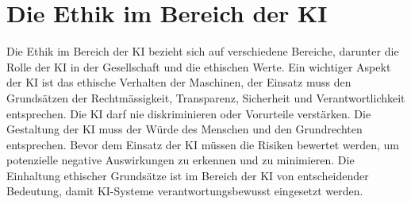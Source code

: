 \chapter{Die Ethik im Bereich der KI}
\label{chap:Die Ethik }

Die Ethik im Bereich der KI bezieht sich auf verschiedene Bereiche, darunter die Rolle der KI in der Gesellschaft und die ethischen Werte. Ein wichtiger Aspekt der KI ist das ethische Verhalten der Maschinen, der Einsatz muss den Grundsätzen der Rechtmässigkeit, Transparenz, Sicherheit und Verantwortlichkeit entsprechen. Die KI darf nie diskriminieren oder Vorurteile verstärken. Die Gestaltung der KI muss der Würde des Menschen und den Grundrechten entsprechen. Bevor dem Einsatz der KI müssen die Risiken bewertet werden, um potenzielle negative Auswirkungen zu erkennen und zu minimieren. Die Einhaltung ethischer Grundsätze ist im Bereich der KI von entscheidender Bedeutung, damit KI-Systeme verantwortungsbewusst eingesetzt werden.